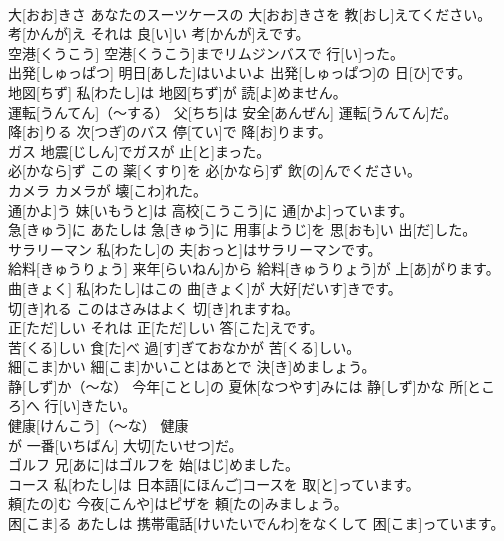 \documentclass[8pt]{extreport}
\begin{document}
\begin{CJK}{UTF8}{min}
\\	大[おお]きさ	あなたのスーツケースの 大[おお]きさを 教[おし]えてください。		
\\	考[かんが]え	それは 良[い]い 考[かんが]えです。		
\\	空港[くうこう]	空港[くうこう]までリムジンバスで 行[い]った。		
\\	出発[しゅっぱつ]	明日[あした]はいよいよ 出発[しゅっぱつ]の 日[ひ]です。		
\\	地図[ちず]	私[わたし]は 地図[ちず]が 読[よ]めません。		
\\	運転[うんてん]（～する）	父[ちち]は 安全[あんぜん] 運転[うんてん]だ。		
\\	降[お]りる	次[つぎ]のバス 停[てい]で 降[お]ります。		
\\	ガス	地震[じしん]でガスが 止[と]まった。		
\\	必[かなら]ず	この 薬[くすり]を 必[かなら]ず 飲[の]んでください。		
\\	カメラ	カメラが 壊[こわ]れた。		
\\	通[かよ]う	妹[いもうと]は 高校[こうこう]に 通[かよ]っています。		
\\	急[きゅう]に	あたしは 急[きゅう]に 用事[ようじ]を 思[おも]い 出[だ]した。		
\\	サラリーマン	私[わたし]の 夫[おっと]はサラリーマンです。		
\\	給料[きゅうりょう]	来年[らいねん]から 給料[きゅうりょう]が 上[あ]がります。		
\\	曲[きょく]	私[わたし]はこの 曲[きょく]が 大好[だいす]きです。		
\\	切[き]れる	このはさみはよく 切[き]れますね。		
\\	正[ただ]しい	それは 正[ただ]しい 答[こた]えです。		
\\	苦[くる]しい	食[た]べ 過[す]ぎておなかが 苦[くる]しい。		
\\	細[こま]かい	細[こま]かいことはあとで 決[き]めましょう。		
\\	静[しず]か（～な）	今年[ことし]の 夏休[なつやす]みには 静[しず]かな 所[ところ]へ 行[い]きたい。		
\\	健康[けんこう]（～な）	健康
\\	が 一番[いちばん] 大切[たいせつ]だ。		
\\	ゴルフ	兄[あに]はゴルフを 始[はじ]めました。		
\\	コース	私[わたし]は 日本語[にほんご]コースを 取[と]っています。		
\\	頼[たの]む	今夜[こんや]はピザを 頼[たの]みましょう。		
\\	困[こま]る	あたしは 携帯電話[けいたいでんわ]をなくして 困[こま]っています。		

\end{CJK}
\end{document}
